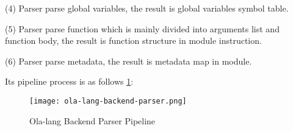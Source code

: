 \begin{itemize}
(4) Parser parse global variables, the result is global variables symbol table.

(5) Parser parse function which is mainly divided into arguments list and function body, the result is function structure in module instruction.

(6) Parser parse metadata, the result is metadata map in module.

Its pipeline process is as follows \ref{fig:ola-lang-backend-parser}:
\begin{figure}[!htbp]
    \centering
    \texttt{[image: ola-lang-backend-parser.png]}
    \caption{Ola-lang Backend Parser Pipeline}
    \label{fig:ola-lang-backend-parser}
\end{figure}
\end{itemize}
